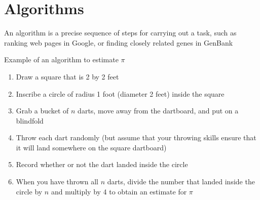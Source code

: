 \documentclass[8pt,a4paper,compress]{beamer}
\begin{document}
\section{Algorithms}
\begin{frame}[fragile]
\pause

An algorithm is a precise sequence of steps for carrying out a task, such as ranking web pages in Google, or finding closely related genes in GenBank

\pause
\bigskip


\begin{minipage}{200pt}
Example of an algorithm to estimate $\pi$

\begin{enumerate}
\item Draw a square that is 2 by 2 feet
\item Inscribe a circle of radius 1 foot (diameter 2 feet) inside the square
\item Grab a bucket of $n$ darts, move away from the dartboard, and put on a blindfold
\item Throw each dart randomly (but assume that your throwing skills ensure that it will land somewhere on the square dartboard)
\item Record whether or not the dart landed inside the circle
\item When you have thrown all $n$ darts, divide the number that landed inside the circle by $n$ and multiply by 4 to obtain an estimate for $\pi$
\end{enumerate}
\end{minipage}%
\hfill
\begin{minipage}{100pt}
\begin{center}
\end{center}
\end{minipage}
\end{frame}
\end{document}
